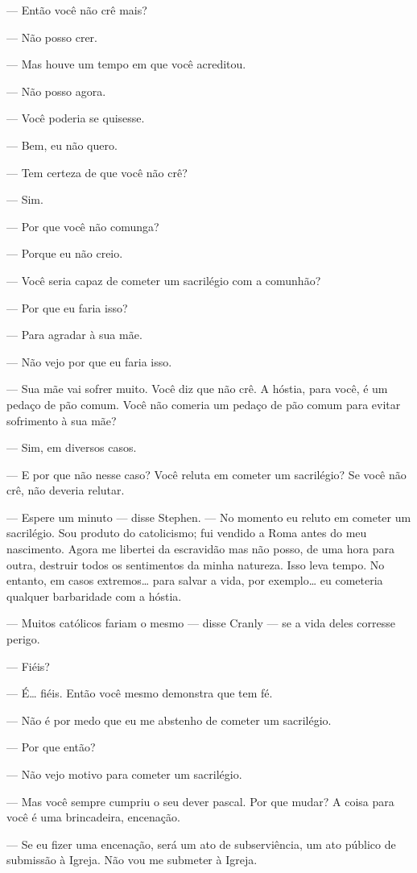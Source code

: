 --- Então você não crê mais?

--- Não posso crer.

--- Mas houve um tempo em que você acreditou.

--- Não posso agora.

--- Você poderia se quisesse.

--- Bem, eu não quero.

--- Tem certeza de que você não crê?

--- Sim.

--- Por que você não comunga?

--- Porque eu não creio.

--- Você seria capaz de cometer um sacrilégio com a comunhão?

--- Por que eu faria isso?

--- Para agradar à sua mãe.

--- Não vejo por que eu faria isso.

--- Sua mãe vai sofrer muito.  Você diz que não crê.  A hóstia, para você, é um
pedaço de pão comum.  Você não comeria um pedaço de pão comum para evitar
sofrimento à sua mãe?

--- Sim, em diversos casos.

--- E por que não nesse caso?  Você reluta em cometer um sacrilégio?  Se você
não crê, não deveria relutar.

--- Espere um minuto --- disse Stephen.  --- No momento eu reluto em cometer um
sacrilégio.  Sou produto do catolicismo; fui vendido a Roma antes do meu
nascimento.  Agora me libertei da escravidão mas não posso, de uma hora para
outra, destruir todos os sentimentos da minha natureza.  Isso leva tempo.  No
entanto, em casos extremos\ldots{} para salvar a vida, por exemplo\ldots{} eu cometeria
qualquer barbaridade com a hóstia.

--- Muitos católicos fariam o mesmo --- disse Cranly --- se a vida deles
corresse perigo.

--- Fiéis?

--- É\ldots{} fiéis.  Então você mesmo demonstra que tem fé.

--- Não é por medo que eu me abstenho de cometer um sacrilégio.

--- Por que então?

--- Não vejo motivo para cometer um sacrilégio.

--- Mas você sempre cumpriu o seu dever pascal.  Por que mudar?  A coisa para
você é uma brincadeira, encenação.

--- Se eu fizer uma encenação, será um ato de subserviência, um ato público de
submissão à Igreja.  Não vou me submeter à Igreja.

